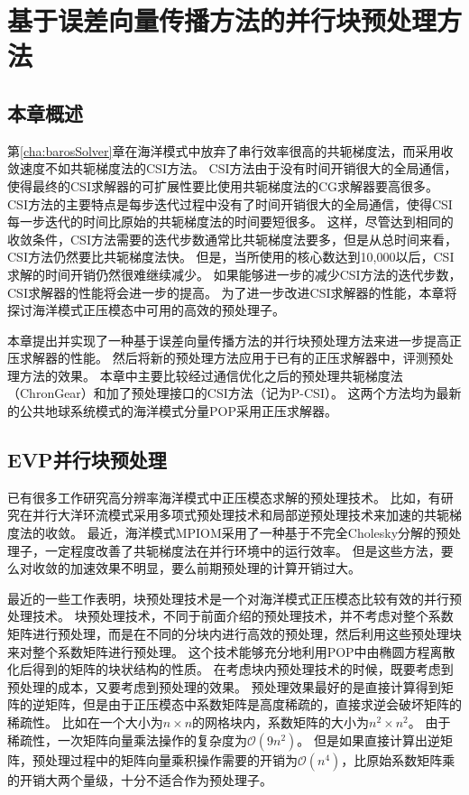 \chapter{基于误差向量传播方法的并行块预处理方法}
\label{cha:precond}

\section{本章概述}

第\ref{cha:barosSolver}章在海洋模式中放弃了串行效率很高的共轭梯度法，而采用收敛速度不如共轭梯度法的CSI方法。
CSI方法由于没有时间开销很大的全局通信，使得最终的CSI求解器的可扩展性要比使用共轭梯度法的CG求解器要高很多。
CSI方法的主要特点是每步迭代过程中没有了时间开销很大的全局通信，使得CSI每一步迭代的时间比原始的共轭梯度法的时间要短很多。 
这样，尽管达到相同的收敛条件，CSI方法需要的迭代步数通常比共轭梯度法要多，但是从总时间来看，CSI方法仍然要比共轭梯度法快。
但是，当所使用的核心数达到10,000以后，CSI求解的时间开销仍然很难继续减少。 
如果能够进一步的减少CSI方法的迭代步数，CSI求解器的性能将会进一步的提高。
为了进一步改进CSI求解器的性能，本章将探讨海洋模式正压模态中可用的高效的预处理子。

本章提出并实现了一种基于误差向量传播方法的并行块预处理方法来进一步提高正压求解器的性能。
然后将新的预处理方法应用于已有的正压求解器中，评测预处理方法的效果。
本章中主要比较经过通信优化之后的预处理共轭梯度法（ChronGear）和加了预处理接口的CSI方法（记为P-CSI）。
这两个方法均为最新的公共地球系统模式的海洋模式分量POP采用正压求解器\cite{yong2015}。 


\section{EVP并行块预处理} 
\label{precond:EVP}

已有很多工作研究高分辨率海洋模式中正压模态求解的预处理技术。 
比如，有研究在并行大洋环流模式采用多项式预处理技术和局部逆预处理技术来加速的共轭梯度法的收敛\cite{smith1992parallel}。 
最近，海洋模式MPIOM采用了一种基于不完全Cholesky分解的预处理子，一定程度改善了共轭梯度法在并行环境中的运行效率\cite{adamidis2011high}。
但是这些方法，要么对收敛的加速效果不明显，要么前期预处理的计算开销过大。 

最近的一些工作表明，块预处理技术是一个对海洋模式正压模态比较有效的并行预处理技术\cite{concus1985block, white2011block}。
块预处理技术，不同于前面介绍的预处理技术，并不考虑对整个系数矩阵进行预处理，而是在不同的分块内进行高效的预处理，然后利用这些预处理块来对整个系数矩阵进行预处理。 
这个技术能够充分地利用POP中由椭圆方程离散化后得到的矩阵的块状结构的性质。
在考虑块内预处理技术的时候，既要考虑到预处理的成本，又要考虑到预处理的效果。
预处理效果最好的是直接计算得到矩阵的逆矩阵，但是由于正压模态中系数矩阵是高度稀疏的，直接求逆会破坏矩阵的稀疏性。
比如在一个大小为$n\times n$的网格块内，系数矩阵的大小为$n^2\times n^2$。
由于稀疏性，一次矩阵向量乘法操作的复杂度为$\mathcal{O}(9n^2)$。 
但是如果直接计算出逆矩阵，预处理过程中的矩阵向量乘积操作需要的开销为$\mathcal{O}(n^4)$，比原始系数矩阵乘的开销大两个量级，十分不适合作为预处理子。

